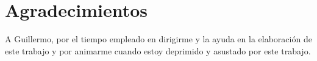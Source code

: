 
\chapter*{Agradecimientos}

A Guillermo, por el tiempo empleado en dirigirme y la ayuda en la elaboración de este trabajo y por animarme cuando estoy deprimido y asustado por este trabajo.











